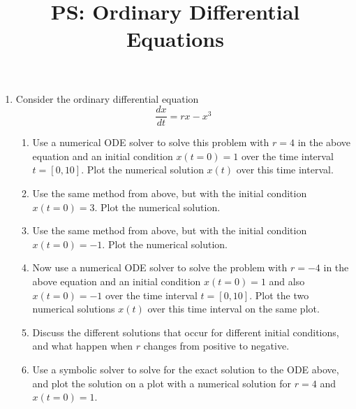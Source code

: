\documentclass{article}
\title{\vspace{-1in} PS: Ordinary Differential Equations}
\date{}
\newcommand{\be}{\begin{enumerate}}
\newcommand{\ee}{\end{enumerate}}
\begin{document}
\maketitle
\be 
\item Consider the ordinary differential equation
\begin{equation}
\frac{dx}{dt} = rx - x^3
\end{equation}

\be
\item Use a numerical ODE solver to solve this problem with $r = 4$ in the above equation and an initial condition $x(t=0) = 1$ over the time interval $t = [0, 10]$. Plot the numerical solution $x(t)$ over this time interval.

\item Use the same method from above, but with the initial condition $x(t=0) = 3$. Plot the numerical solution. 

\item Use the same method from above, but with the initial condition $x(t=0) = -1$. Plot the numerical solution. 

\item Now use a numerical ODE solver to solve the problem with $r = -4$ in the above equation and an initial condition $x(t=0) = 1$ and also $x(t=0) = -1$  over the time interval $t = [0, 10]$. Plot the two numerical solutions $x(t)$ over this time interval on the same plot.

\item Discuss the different solutions that occur for different initial conditions, and what happen when $r$ changes from positive to negative.

\item Use a symbolic solver to solve for the exact solution to the ODE above, and plot the solution on a plot with a numerical solution for $r = 4$ and $x(t=0) = 1$.

\ee



\ee
\end{document}
